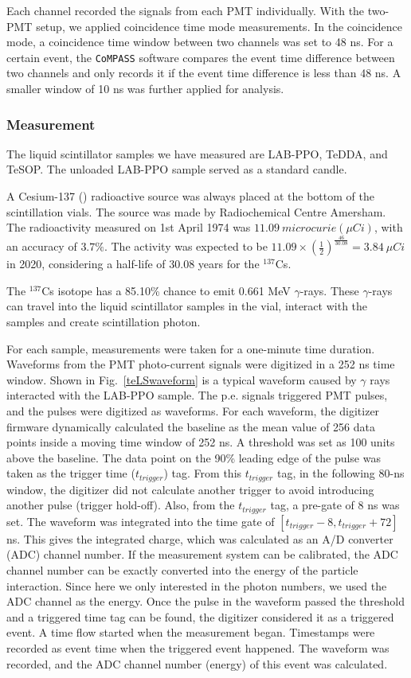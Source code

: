 Each channel recorded the signals from each PMT individually. With the two-PMT setup, we applied coincidence time mode measurements. In the coincidence mode, a coincidence time window between two channels was set to 48 ns. For a certain event, the \texttt{CoMPASS} software compares the event time difference between two channels and only records it if the event time difference is less than 48 ns. A smaller window of 10 ns was further applied for analysis.

\subsubsection{Measurement}

The liquid scintillator samples we have measured are LAB-PPO, TeDDA, and TeSOP. The unloaded LAB-PPO sample served as a standard candle. 

A Cesium-137 () radioactive source was always placed at the bottom of the scintillation vials.
The source was made by Radiochemical Centre Amersham. The radioactivity measured on 1st April 1974 was $11.09~microcurie(\mu Ci)$, with an accuracy of $3.7\%$. The activity was expected to be 
$11.09\times ({\frac{1}{2}})^{\frac{46}{30.08}}=3.84~\mu Ci$ in 2020, considering a half-life of 30.08 years for the $^{137}$Cs\cite{nndc}.

The $^{137}$Cs isotope has a 85.10\% chance to emit 0.661 MeV $\gamma$-rays\cite{nndc}. These $\gamma$-rays can travel into the liquid scintillator samples in the vial, interact with the samples and create scintillation photon.

For each sample, measurements were taken for a one-minute time duration. Waveforms from the PMT photo-current signals were digitized in a 252 ns time window. Shown in Fig.~\ref{teLSwaveform} is a typical waveform caused by $\gamma$ rays interacted with the LAB-PPO sample. The p.e. signals triggered PMT pulses, and the pulses were digitized as waveforms. For each waveform, the digitizer firmware dynamically calculated the baseline as the mean value of 256 data points inside a moving time window of 252 ns. A threshold was set as 100 units above the baseline. The data point on the 90\% leading edge of the pulse was taken as the trigger time ($t_{trigger}$) tag.
From this $t_{trigger}$ tag, in the following 80-ns window, the digitizer did not calculate another trigger to avoid introducing another pulse (trigger hold-off). Also, from the $t_{trigger}$ tag, a pre-gate of 8 ns was set. The waveform was integrated into the time gate of $[t_{trigger}-8, t_{trigger}+72]$ ns. This gives the integrated charge, which was calculated as an A/D converter (ADC) channel number. If the measurement system can be calibrated, the ADC channel number can be exactly converted into the energy of the particle interaction. Since here we only interested in the photon numbers, we used the ADC channel as the energy. Once the pulse in the waveform passed the threshold and a triggered time tag can be found, the digitizer considered it as a triggered event. A time flow started when the measurement began. Timestamps were recorded as event time when the triggered event happened. The waveform was recorded, and the ADC channel number (energy) of this event was calculated.

